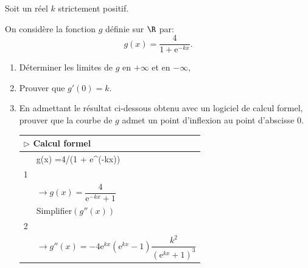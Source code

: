 \medskip

Soit un réel $k$ strictement positif.

On considère la fonction $g$ définie sur $\R$ par:
\[g(x) = \dfrac{4}{1 + \text{e}^{- kx}}.\]

\smallskip

\begin{enumerate}
\item  Déterminer les limites de $g$ en $+ \infty$ et en $-\infty$,
\item  Prouver que $g'(0) = k$.
\item  En admettant le résultat ci-dessous obtenu avec un logiciel de calcul formel,
prouver que la courbe de $g$ admet un point d'inflexion au point d'abscisse 0.
\begin{center}
\begin{tabular}{|c l|}\hline
\multicolumn{2}{|l|}{$\triangleright$ Calcul formel}\\ \hline
&g(x) =4/(1 + e{}\^{}(-kx))\\
1&\\
&$\to g(x) = \dfrac{4}{\text{e}^{-kx} + 1}$\\ \hline
&Simplifier$(g''(x))$\\
2&\\
&$\to g''(x) = - 4\text{e}^{kx}\left(\text{e}^{kx} - 1\right)\dfrac{k^2}{\left(\text{e}^{kx} + 1 \right)^3}$\\ \hline
\end{tabular}
\end{center}
\end{enumerate}

\bigskip
